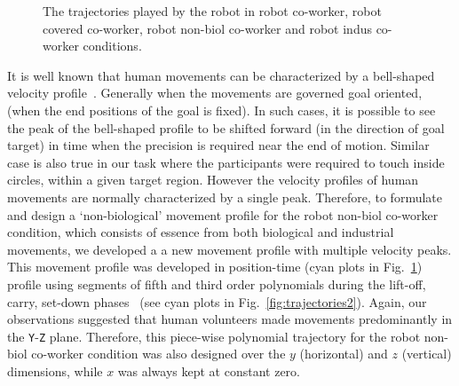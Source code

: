  
\begin{figure}[hpt]
	\caption{The trajectories played by the robot in robot co-worker, robot covered co-worker, robot non-biol co-worker and robot indus co-worker conditions.}
	\label{fig:trajectories}
\end{figure}


It is well known that human movements can be characterized by a bell-shaped velocity profile~\cite{flash1985coordination}. Generally when the movements are governed goal oriented, (when the end positions of the goal is fixed). In such cases, it is possible to see the peak of the bell-shaped profile to be shifted forward (in the direction of goal target) in time when the precision is required near the end of motion. Similar case is also true in our task where the participants were required to touch inside circles, within a given target region. However the velocity profiles of human movements are normally characterized by a single peak. Therefore, to formulate and design a `non-biological' movement profile for the robot non-biol co-worker condition, which consists of essence from both biological and industrial movements, we developed a a new movement profile with multiple velocity peaks. This movement profile was developed in position-time (cyan plots in Fig.~\ref{fig:trajectories}) profile using segments of fifth and third order polynomials during the lift-off, carry, set-down phases~\cite{Biagiotti:Springer:2008} (see cyan plots in Fig.~\ref{fig:trajectories2}). Again, our observations suggested that human volunteers made movements predominantly in the \texttt{Y}-\texttt{Z} plane. Therefore, this piece-wise polynomial trajectory for the robot non-biol co-worker condition was also designed over the $y$ (horizontal) and $z$ (vertical) dimensions, while $x$ was always kept at constant zero.



